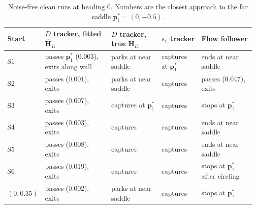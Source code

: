 \documentclass[10.5pt]{article}
\begin{document}
\begin{table}[h]
\centering\small
\caption{Noise-free clean runs at heading 0. Numbers are the closest approach to the far saddle $\mathbf p_1^*=(0,-0.5)$.}
\label{tab:oracle}
\begin{tabularx}{\linewidth}{@{}l>{\raggedright}X>{\raggedright}X>{\raggedright}X>{\raggedright\arraybackslash}X@{}}
\toprule
Start & $D$ tracker, fitted $\hat{\mathbf H}_D$ & $D$ tracker, true $\mathbf H_D$ & $s_1$ tracker & Flow follower\\
\midrule
S1 & passes $\mathbf p_1^*$ (0.003), exits along wall & parks at near saddle & captures at $\mathbf p_1^*$ & ends at near saddle\\
S2 & passes (0.001), exits & parks at near saddle & captures & passes (0.047), exits\\
S3 & passes (0.007), exits & captures at $\mathbf p_1^*$ & captures & stops at $\mathbf p_1^*$\\
S4 & passes (0.003), exits & captures & captures & ends at near saddle\\
S5 & passes (0.008), exits & captures & captures & ends at near saddle\\
S6 & passes (0.019), exits & captures & captures & stops at $\mathbf p_1^*$ after circling\\
$(0,0.35)$ & passes (0.002), exits & parks at near saddle & captures & stops at $\mathbf p_1^*$\\
\bottomrule
\end{tabularx}
\end{table}
\end{document}
